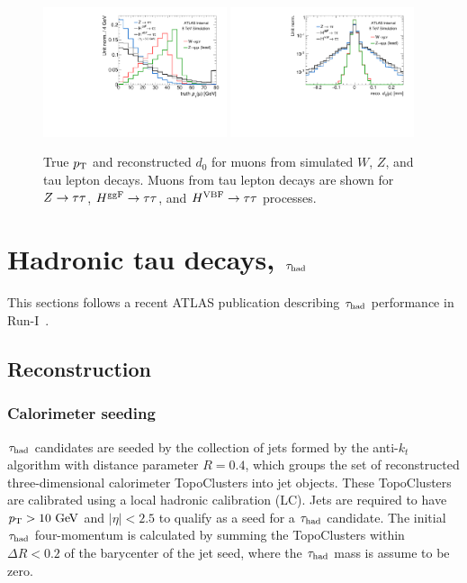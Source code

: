 \begin{figure}[tp]
  \centering
  \includegraphics[width=0.48\textwidth]{figures/tauperformance/leptonsfromtausaresoft}
  \includegraphics[width=0.48\textwidth]{figures/tauperformance/leptond0}
  \caption{True $p_{\mathrm{T}}$ and reconstructed $d_0$ for muons from simulated $W$, $Z$, and tau lepton decays. Muons from tau lepton decays are shown for $Z\rightarrow\tau\tau$, $H^{\text{ggF}}\rightarrow\tau\tau$, and $H^{\text{VBF}}\rightarrow\tau\tau$ processes.}
  \label{fig:taus-leptonpt}
\end{figure}


\section{Hadronic tau decays, $\tau_\text{had}$}
\label{sec:taus-hadrons}

This sections follows a recent ATLAS publication describing $\tau_\text{had}$ performance in Run-I~\cite{PERF-2013-06}.

\subsection{Reconstruction}

\subsubsection{Calorimeter seeding}

$\tau_\text{had}$ candidates are seeded by the collection of jets formed by the anti-$k_t$ algorithm with distance parameter $R=0.4$, which groups the set of reconstructed three-dimensional calorimeter TopoClusters into jet objects. These TopoClusters are calibrated using a local hadronic calibration (LC). Jets are required to have $\pt > 10 \GeV$ and $|\eta| < 2.5$ to qualify as a seed for a $\tau_\text{had}$ candidate. The initial $\tau_\text{had}$ four-momentum is calculated by summing the TopoClusters within $\Delta R < 0.2$ of the barycenter of the jet seed, where the $\tau_\text{had}$ mass is assume to be zero.

